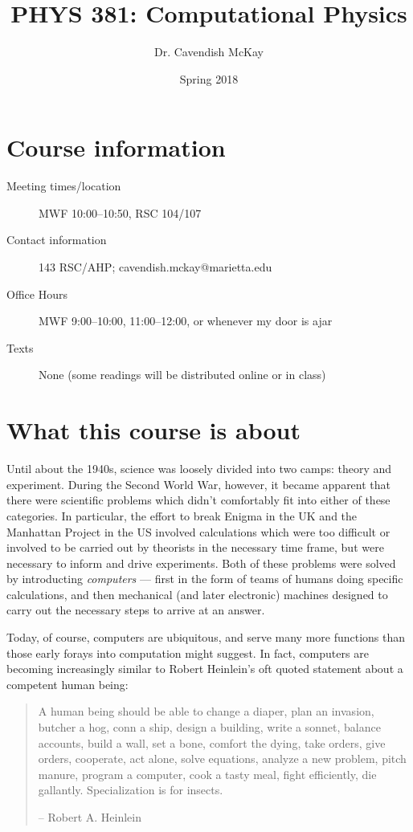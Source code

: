 \documentclass{tufte-handout}
\author{Dr. Cavendish McKay}
\date{Spring 2018}
\title{PHYS 381: Computational Physics}
\begin{document}
\maketitle

\section{Course information}
\label{sec-1}
\begin{description}
\item[{Meeting times/location}] MWF 10:00--10:50, RSC 104/107
\item[{Contact information}] 143 RSC/AHP; cavendish.mckay@marietta.edu
\item[{Office Hours}] MWF 9:00--10:00, 11:00--12:00, or whenever my door is ajar
\item[{Texts}] None (some readings will be distributed online or in class)
\end{description}
\section{What this course is about}
\label{sec-2}
Until about the 1940s, science was loosely divided into two camps: theory and experiment. During the Second World War, however, it became apparent that there were scientific problems which didn't comfortably fit into either of these categories. In particular, the effort to break Enigma in the UK and the Manhattan Project in the US involved calculations which were too difficult or involved to be carried out by theorists in the necessary time frame, but were necessary to inform and drive experiments.  Both of these problems were solved by introducting \emph{computers} --- first in the form of teams of humans doing specific calculations, and then mechanical (and later electronic) machines designed to carry out the necessary steps to arrive at an answer.

Today, of course, computers are ubiquitous, and serve many more functions than those early forays into computation might suggest. In fact, computers are becoming increasingly similar to Robert Heinlein's oft quoted statement about a competent human being:

\begin{quote}
A human being should be able to change a diaper, plan an invasion, butcher a hog, conn a ship, design a building, write a sonnet, balance accounts, build a wall, set a bone, comfort the dying, take orders, give orders, cooperate, act alone, solve equations, analyze a new problem, pitch manure, program a computer, cook a tasty meal, fight efficiently, die gallantly. Specialization is for insects.

-- Robert A. Heinlein
\end{quote}
\end{document}
